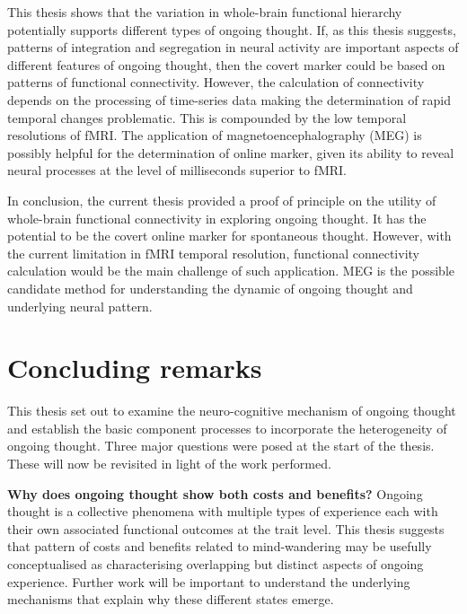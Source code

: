 This thesis shows that the variation in whole-brain functional hierarchy potentially supports different types of ongoing thought. If, as this thesis suggests, patterns of integration and segregation in neural activity are important aspects of different features of ongoing thought, then the covert marker could be based on patterns of functional connectivity. However, the calculation of connectivity depends on the processing of time-series data making the determination of rapid temporal changes problematic. This is compounded by the low temporal resolutions of fMRI. The application of magnetoencephalography (MEG) is possibly helpful for the determination of online marker, given its ability to reveal neural processes at the level of milliseconds superior to fMRI.

In conclusion, the current thesis provided a proof of principle on the utility of whole-brain functional connectivity in exploring ongoing thought. It has the potential to be the covert online marker for spontaneous thought. However, with the current limitation in fMRI temporal resolution, functional connectivity calculation would be the main challenge of such application. MEG is the possible candidate method for understanding the dynamic of ongoing thought and underlying neural pattern.



\section{Concluding remarks}
\label{ch:discussion:summary}

This thesis set out to examine the neuro-cognitive mechanism of ongoing thought and establish the basic component processes to incorporate the heterogeneity of ongoing thought. Three major questions were posed at the start of the thesis. These will now be revisited in light of the work performed.

\textbf{Why does ongoing thought show both costs and benefits?} Ongoing thought is a collective phenomena with multiple types of experience each with their own associated functional outcomes at the trait level. This thesis suggests that pattern of costs and benefits related to mind-wandering may be usefully conceptualised as characterising overlapping but distinct aspects of ongoing experience. Further work will be important to understand the underlying mechanisms that explain why these different states emerge.

